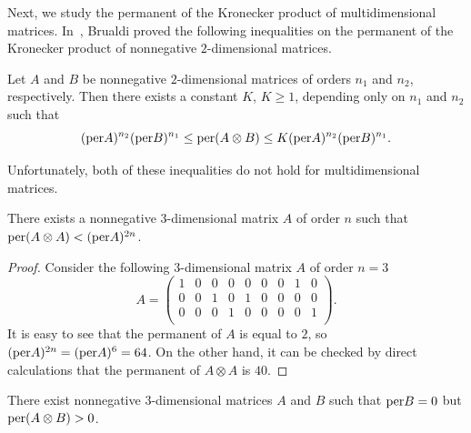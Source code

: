 \documentclass[a4paper]{article}
\begin{document}
Next, we study the permanent of the Kronecker product of multidimensional matrices. In~\cite{brualdi.perdirprod}, Brualdi proved the following inequalities on the permanent of the Kronecker product of nonnegative $2$-dimensional matrices. 


\begin{teorema}
Let $A$ and $B$ be nonnegative $2$-dimensional matrices of orders $n_1$ and $n_2$, respectively. Then there exists a constant $K$, $K \geq 1$, depending only on  $n_1$ and $n_2$ such that 
$$ ({\rm per} A)^{n_2} ({\rm per} B)^{n_1} \leq {\rm per} (A \otimes B) \leq K ({\rm per} A)^{n_2} ({\rm per} B)^{n_1}.$$
\end{teorema}


Unfortunately, both of these inequalities do not hold for multidimensional matrices.


\begin{zam}
There exists a nonnegative $3$-dimensional matrix $A$ of order $n$ such that ${\rm per} (A \otimes A) < ({\rm per} A)^{2n}$.
\end{zam}

\begin{proof}
Consider the following $3$-dimensional matrix $A$ of order $n =3$
$$
A = \left( \begin{array}{ccc|ccc|ccc}
1 & 0 & 0 & 0 & 0 & 0 & 0 & 1 & 0 \\
0 & 0 & 1 & 0 & 1 & 0 & 0 & 0 & 0 \\
0 & 0 & 0 & 1 & 0 & 0 & 0 & 0 & 1 \\
\end{array}\right).
$$
It is easy to see that the permanent of $A$ is equal to $2$, so $({\rm per} A)^{2n} = ({\rm per} A)^{6} = 64$. On the other hand, it can be checked by direct calculations that the permanent of $A \otimes A$ is $40$.  
\end{proof}


\begin{zam}
There exist nonnegative $3$-dimensional matrices $A$ and $B$ such that ${\rm per} B = 0$ but ${\rm per} (A \otimes B) >0$.
\end{zam}
\end{document}
